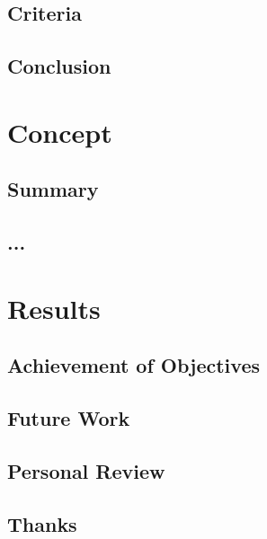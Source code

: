 \documentclass[a4paper,parskip=full]{scrreprt}
\begin{document}
\section{Criteria}

\section{Conclusion}


\chapter{Concept}

\section{Summary}

\section{...}


\chapter{Results}

\section{Achievement of Objectives}

\section{Future Work}

\section{Personal Review}

\section{Thanks}
\end{document}

